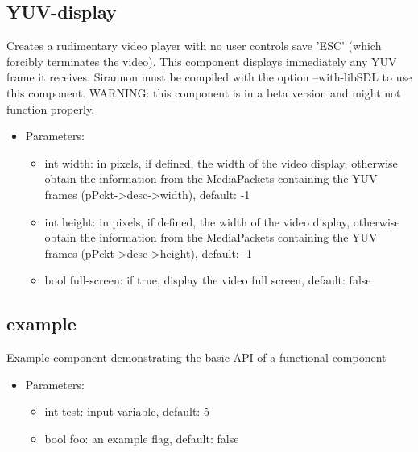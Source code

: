 \subsection{YUV-display}
Creates a rudimentary video player with no user controls save 'ESC' (which forcibly terminates the video). This component displays immediately any YUV frame it receives. Sirannon must be compiled with the option --with-libSDL to use this component.
\newline WARNING: this component is in a beta version and might not function properly.\begin{itemize}
\item Parameters:
\begin{itemize}
\item int width: in pixels, if defined, the width of the video display, otherwise obtain the information from the MediaPackets containing the YUV frames (pPckt->desc->width), default: -1
\item int height: in pixels, if defined, the width of the video display, otherwise obtain the information from the MediaPackets containing the YUV frames (pPckt->desc->height), default: -1
\item bool full-screen: if true, display the video full screen, default: false
\end{itemize}
\end{itemize}
\subsection{example}
Example component demonstrating the basic API of a functional component
\begin{itemize}
\item Parameters:
\begin{itemize}
\item int test: input variable, default: 5
\item bool foo: an example flag, default: false
\end{itemize}
\end{itemize}
